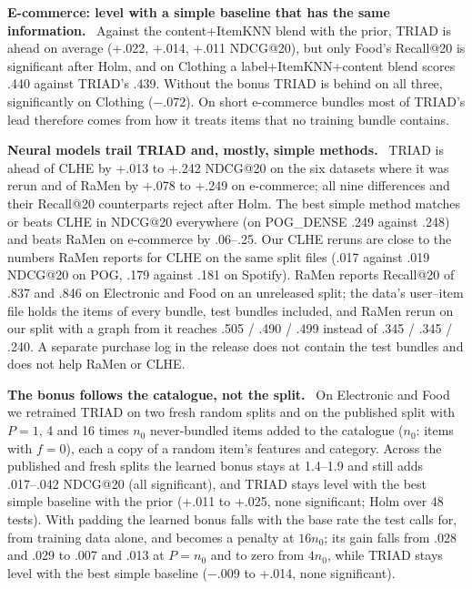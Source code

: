 \documentclass[runningheads]{llncs}
\renewcommand{\paragraph}[1]{\smallskip\noindent\textbf{#1}\ }
\begin{document}
\paragraph{E-commerce: level with a simple baseline that has the same information.} Against the content+ItemKNN blend
with the prior, TRIAD is ahead on average (+.022, +.014, +.011 NDCG@20), but only Food's Recall@20 is significant
after Holm, and on Clothing a label+ItemKNN+content blend scores .440 against TRIAD's .439. Without the bonus TRIAD is
behind on all three, significantly on Clothing ($-$.072). On short e-commerce bundles most of TRIAD's lead therefore
comes from how it treats items that no training bundle contains.

\paragraph{Neural models trail TRIAD and, mostly, simple methods.} TRIAD is ahead of CLHE by +.013 to +.242 NDCG@20 on
the six datasets where it was rerun and of RaMen by +.078 to +.249 on e-commerce; all nine differences and their
Recall@20 counterparts reject after Holm. The best simple method matches or beats CLHE in NDCG@20 everywhere (on
POG\_DENSE .249 against .248) and beats RaMen on e-commerce by .06--.25. Our CLHE reruns are close to the numbers RaMen reports
for CLHE on the same split files (.017 against .019 NDCG@20 on POG, .179 against .181 on Spotify). RaMen reports
Recall@20 of .837 and .846 on Electronic and Food on an unreleased split; the data's user--item file holds the items
of every bundle, test bundles included, and RaMen rerun on our split with a graph from it reaches .505 / .490 / .499
instead of .345 / .345 / .240. A separate purchase log in the release does not contain the test bundles and does not
help RaMen or CLHE.

\paragraph{The bonus follows the catalogue, not the split.} On Electronic and Food we retrained TRIAD on two fresh
random splits and on the published split with $P=1$, 4 and 16 times $n_0$ never-bundled items added to the catalogue
($n_0$: items with $f=0$), each a copy of a random item's features and category. Across the published and fresh splits the learned bonus
stays at 1.4--1.9 and still adds .017--.042 NDCG@20 (all significant), and TRIAD stays level with the best simple
baseline with the prior (+.011 to +.025, none significant; Holm over 48 tests). With padding the learned bonus falls
with the base rate the test calls for, from training data alone, and becomes a penalty at $16n_0$; its gain falls
from .028 and .029 to .007 and .013 at $P=n_0$ and to zero from $4n_0$, while TRIAD stays level with the best simple
baseline ($-$.009 to +.014, none significant).
\end{document}
